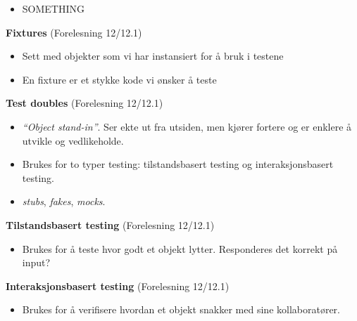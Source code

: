 \begin{itemize}
\item
  SOMETHING
\end{itemize}
\textbf{Fixtures} (Forelesning 12/12.1)

\begin{itemize}
\item
  Sett med objekter som vi har instansiert for å bruk i testene
\item
  En fixture er et stykke kode vi ønsker å teste
\end{itemize}
\textbf{Test doubles} (Forelesning 12/12.1)

\begin{itemize}
\item
  \emph{``Object stand-in''}. Ser ekte ut fra utsiden, men kjører
  fortere og er enklere å utvikle og vedlikeholde.
\item
  Brukes for to typer testing: tilstandsbasert testing og
  interaksjonsbasert testing.
\item
  \emph{stubs}, \emph{fakes}, \emph{mocks}.
\end{itemize}
\textbf{Tilstandsbasert testing} (Forelesning 12/12.1)

\begin{itemize}
\item
  Brukes for å teste hvor godt et objekt lytter. Responderes det korrekt
  på input?
\end{itemize}
\textbf{Interaksjonsbasert testing} (Forelesning 12/12.1)

\begin{itemize}
\item
  Brukes for å verifisere hvordan et objekt snakker med sine
  kollaboratører.
\end{itemize}
